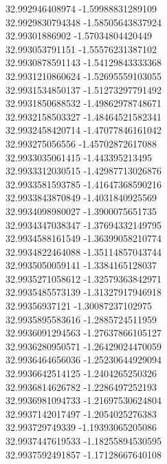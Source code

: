 {32.992946408974	-1.59988831289109\\
32.9929830794348	-1.58505643837924\\
32.99301886902	-1.57034804420449\\
32.993053791151	-1.55576231387102\\
32.9930878591143	-1.54129843333368\\
32.9931210860624	-1.52695559103055\\
32.9931534850137	-1.51273297791492\\
32.9931850688532	-1.49862978748671\\
32.9932158503327	-1.48464521582341\\
32.9932458420714	-1.47077846161042\\
32.993275056556	-1.45702872617088\\
32.9933035061415	-1.443395213495\\
32.9933312030515	-1.42987713026876\\
32.9933581593785	-1.41647368590216\\
32.9933843870849	-1.4031840925569\\
32.9934098980027	-1.3900075651735\\
32.9934347038347	-1.37694332149795\\
32.9934588161549	-1.36399058210774\\
32.9934822464088	-1.35114857043744\\
32.9935050059141	-1.3384165128037\\
32.9935271058612	-1.32579363842971\\
32.9935485573139	-1.31327917946918\\
32.99356937121	-1.30087237102975\\
32.9935895583616	-1.2885724511959\\
32.9936091294563	-1.27637866105127\\
32.9936280950571	-1.26429024470059\\
32.9936464656036	-1.25230644929094\\
32.9936642514125	-1.2404265250326\\
32.9936814626782	-1.2286497252193\\
32.9936981094733	-1.21697530624804\\
32.9937142017497	-1.2054025276383\\
32.993729749339	-1.19393065205086\\
32.9937447619533	-1.18255894530595\\
32.9937592491857	-1.17128667640108\\
}
